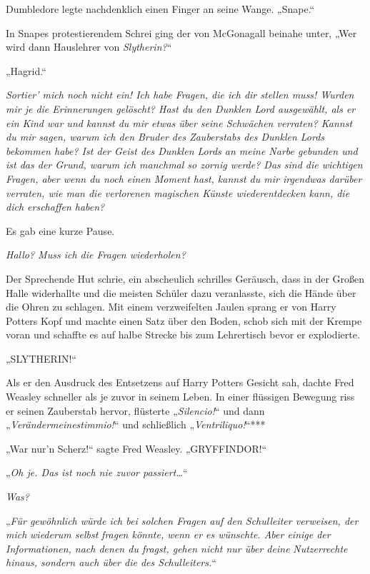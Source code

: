 {Dumbledore legte nachdenklich einen Finger an seine Wange. „Snape.“

In Snapes protestierendem Schrei ging der von McGonagall beinahe unter, „Wer wird dann Hauslehrer von \emph{Slytherin?}“

„Hagrid.“

\later

\emph{Sortier' mich noch nicht ein! Ich habe Fragen, die ich dir stellen muss! Wurden mir je die Erinnerungen gelöscht? Hast du den Dunklen Lord ausgewählt, als er ein Kind war und kannst du mir etwas über seine Schwächen verraten? Kannst du mir sagen, warum ich den Bruder des Zauberstabs des Dunklen Lords bekommen habe? Ist der Geist des Dunklen Lords an meine Narbe gebunden und ist das der Grund, warum ich manchmal so zornig werde? Das sind die wichtigen Fragen, aber wenn du noch einen Moment hast, kannst du mir irgendwas darüber verraten, wie man die verlorenen magischen Künste wiederentdecken kann, die dich erschaffen haben?}

Es gab eine kurze Pause.

\emph{Hallo? Muss ich die Fragen wiederholen?}

Der Sprechende Hut schrie, ein abscheulich schrilles Geräusch, dass in der Großen Halle widerhallte und die meisten Schüler dazu veranlasste, sich die Hände über die Ohren zu schlagen. Mit einem verzweifelten Jaulen sprang er von Harry Potters Kopf und machte einen Satz über den Boden, schob sich mit der Krempe voran und schaffte es auf halbe Strecke bis zum Lehrertisch bevor er explodierte.

\later

„SLYTHERIN!“

Als er den Ausdruck des Entsetzens auf Harry Potters Gesicht sah, dachte Fred Weasley schneller als je zuvor in seinem Leben. In einer flüssigen Bewegung riss er seinen Zauberstab hervor, flüsterte „\emph{Silencio!}“ und dann „\emph{Verändermeinestimmio!}“ und schließlich „\emph{Ventriliquo!}“***

„War nur'n Scherz!“ sagte Fred Weasley. „GRYFFINDOR!“

\later

„\emph{Oh je. Das ist noch nie zuvor passiert…}“

\emph{Was?}

„\emph{Für gewöhnlich würde ich bei solchen Fragen auf den Schulleiter verweisen, der mich} \emph{wiederum selbst} \emph{fragen könnte, wenn er es wünschte. Aber einige der Informationen, nach denen du fragst, gehen nicht nur über deine} \emph{Nutzerrechte} \emph{hinaus, sondern auch über die des Schulleiters.}“

}
